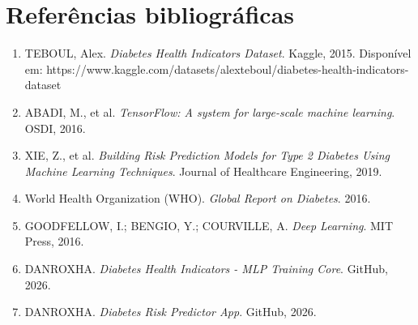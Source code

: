 \documentclass[
    12pt,
    article,
    oneside,
    a4paper,
    english,
    brazil
]{abntex2}
\begin{document}
\section{Referências bibliográficas}\label{referuxeancias-bibliogruxe1ficas}

\begin{enumerate}

\def\labelenumi{\arabic{enumi}.}

\tightlist

\item TEBOUL, Alex. \emph{Diabetes Health Indicators Dataset}. Kaggle, 2015. Disponível em: https://www.kaggle.com/datasets/alexteboul/diabetes-health-indicators-dataset
\item ABADI, M., et al. \emph{TensorFlow: A system for large-scale machine learning}. OSDI, 2016.
\item XIE, Z., et al. \emph{Building Risk Prediction Models for Type 2 Diabetes Using Machine Learning Techniques}. Journal of Healthcare Engineering, 2019.
\item World Health Organization (WHO). \emph{Global Report on Diabetes}. 2016.
\item GOODFELLOW, I.; BENGIO, Y.; COURVILLE, A. \emph{Deep Learning}. MIT Press, 2016.
\item DANROXHA. \emph{Diabetes Health Indicators - MLP Training Core}. GitHub, 2026.
\item DANROXHA. \emph{Diabetes Risk Predictor App}. GitHub, 2026.
\end{enumerate}
\end{document}
